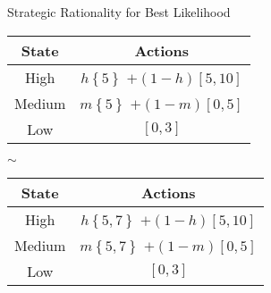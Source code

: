 \documentclass[usenames,dvipsnames,aspectratio=169,11pt, envcountsect, handout]{beamer}
\begin{document}
\begin{frame}{Strategic Rationality for Best Likelihood}
	\begin{table}[H]
		\centering
		\begin{minipage}{0.45\textwidth}
			\centering
			\begin{tabular}{c | c}
				State                          & Actions                                                                                       \\
				\hline
				{\color{bleudefrance} High}    & {\color{bleudefrance}\( h \left\{ 5 \right\} \) } \(+ \left(1-h \right) \left[5,10 \right] \) \\
				{\color{bleudefrance} Medium } & {\color{bleudefrance}\( m \left\{ 5 \right\} \) } \(+ \left(1-m \right) \left[0,5 \right] \)  \\
				Low                            & \( \left[0,3 \right] \)                                                                       \\
			\end{tabular}
		\end{minipage}\hspace{0.25cm} %
		\( \sim \) %
		\hspace{0.25cm}
		\begin{minipage}{0.45\textwidth}
			\centering
			\begin{tabular}{c | c}
				State                          & Actions                                                                                         \\
				\hline
				{\color{bleudefrance} High}    & {\color{bleudefrance}\( h \left\{ 5,7 \right\} \) } \(+ \left(1-h \right) \left[5,10 \right] \) \\
				{\color{bleudefrance} Medium } & {\color{bleudefrance}\( m \left\{ 5,7 \right\} \) } \(+ \left(1-m \right) \left[0,5 \right] \)  \\
				Low                            & \( \left[0,3 \right] \)                                                                         \\
			\end{tabular}
		\end{minipage}
	\end{table}

\end{frame}
\end{document}
